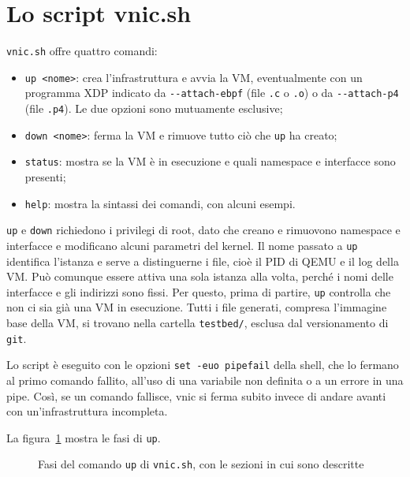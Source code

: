 

\section{Lo script vnic.sh}\label{sec:vnic-sh}

\texttt{vnic.sh} offre quattro comandi:
\begin{itemize}
    \item \texttt{up <nome>}: crea l'infrastruttura e avvia la VM, eventualmente con un programma XDP indicato da \texttt{-{}-attach-ebpf} (file \texttt{.c} o \texttt{.o}) o da \texttt{-{}-attach-p4} (file \texttt{.p4}). Le due opzioni sono mutuamente esclusive;
    \item \texttt{down <nome>}: ferma la VM e rimuove tutto ciò che \texttt{up} ha creato;
    \item \texttt{status}: mostra se la VM è in esecuzione e quali namespace e interfacce sono presenti;
    \item \texttt{help}: mostra la sintassi dei comandi, con alcuni esempi.
\end{itemize}
\texttt{up} e \texttt{down} richiedono i privilegi di root, dato che creano e rimuovono namespace e interfacce e modificano alcuni parametri del kernel. Il nome passato a \texttt{up} identifica l'istanza e serve a distinguerne i file, cioè il PID di QEMU e il log della VM. Può comunque essere attiva una sola istanza alla volta, perché i nomi delle interfacce e gli indirizzi sono fissi. Per questo, prima di partire, \texttt{up} controlla che non ci sia già una VM in esecuzione. Tutti i file generati, compresa l'immagine base della VM, si trovano nella cartella \texttt{testbed/}, esclusa dal versionamento di \texttt{git}.

Lo script è eseguito con le opzioni \texttt{set -euo pipefail} della shell, che lo fermano al primo comando fallito, all'uso di una variabile non definita o a un errore in una pipe. Così, se un comando fallisce, vnic si ferma subito invece di andare avanti con un'infrastruttura incompleta.

La figura~\ref{fig:sequenza-up} mostra le fasi di \texttt{up}.

\begin{figure}[H]
    \centering
    
    \caption{Fasi del comando \texttt{up} di \texttt{vnic.sh}, con le sezioni in cui sono descritte}
    \label{fig:sequenza-up}
\end{figure}


